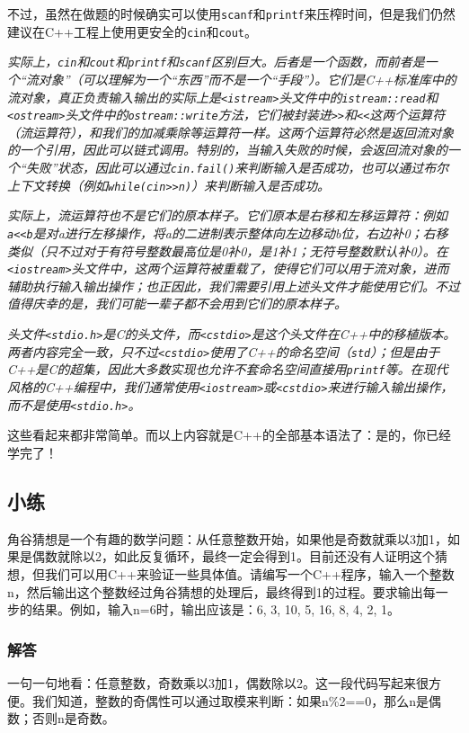 \documentclass[../main.tex]{subfiles}
\begin{document}
不过，虽然在做题的时候确实可以使用\texttt{scanf}和\texttt{printf}来压榨时间，但是我们仍然建议在C++工程上使用更安全的\texttt{cin}和\texttt{cout}。

\emph{实际上，\texttt{cin}和\texttt{cout}和\texttt{printf}和\texttt{scanf}区别巨大。后者是一个函数，而前者是一个“流对象”（可以理解为一个“东西”而不是一个“手段”）。它们是C++标准库中的流对象，真正负责输入输出的实际上是\texttt{<istream>}头文件中的\texttt{istream::read}和\texttt{<ostream>}头文件中的\texttt{ostream::write}方法，它们被封装进\texttt{>>}和\texttt{<<}这两个运算符（流运算符），和我们的加减乘除等运算符一样。这两个运算符必然是返回流对象的一个引用，因此可以链式调用。特别的，当输入失败的时候，会返回流对象的一个“失败”状态，因此可以通过\texttt{cin.fail()}来判断输入是否成功，也可以通过布尔上下文转换（例如\texttt{while(cin>>n)}）来判断输入是否成功。}

\emph{实际上，流运算符也不是它们的原本样子。它们原本是右移和左移运算符：例如\texttt{a<<b}是对a进行左移操作，将a的二进制表示整体向左边移动b位，右边补0；右移类似（只不过对于有符号整数最高位是0补0，是1补1；无符号整数默认补0）。在\texttt{<iostream>}头文件中，这两个运算符被重载了，使得它们可以用于流对象，进而辅助执行输入输出操作；也正因此，我们需要引用上述头文件才能使用它们。不过值得庆幸的是，我们可能一辈子都不会用到它们的原本样子。}

\emph{头文件\texttt{<stdio.h>}是C的头文件，而\texttt{<cstdio>}是这个头文件在C++中的移植版本。两者内容完全一致，只不过\texttt{<cstdio>}使用了C++的命名空间（\texttt{std}）；但是由于C++是C的超集，因此大多数实现也允许不套命名空间直接用\texttt{printf}等。在现代风格的C++编程中，我们通常使用\texttt{<iostream>}或\texttt{<cstdio>}来进行输入输出操作，而不是使用\texttt{<stdio.h>}。}

这些看起来都非常简单。而以上内容就是C++的全部基本语法了：是的，你已经学完了！

\subsection{小练}

角谷猜想是一个有趣的数学问题：从任意整数开始，如果他是奇数就乘以3加1，如果是偶数就除以2，如此反复循环，最终一定会得到1。目前还没有人证明这个猜想，但我们可以用C++来验证一些具体值。请编写一个C++程序，输入一个整数n，然后输出这个整数经过角谷猜想的处理后，最终得到1的过程。要求输出每一步的结果。例如，输入n=6时，输出应该是：6, 3, 10, 5, 16, 8, 4, 2, 1。

\subsubsection{解答}
一句一句地看：任意整数，奇数乘以3加1，偶数除以2。这一段代码写起来很方便。我们知道，整数的奇偶性可以通过取模来判断：如果n\%2==0，那么n是偶数；否则n是奇数。
\end{document}
